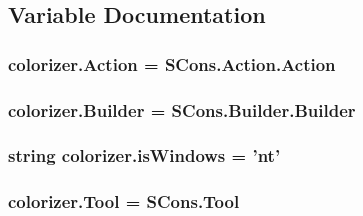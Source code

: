 \subsection{Variable Documentation}
\hypertarget{namespacecolorizer_ad54e0b191b008f45a3c9a0f46f001ec6}{
\subsubsection[{Action}]{\setlength{\rightskip}{0pt plus 5cm}colorizer.\-Action = S\-Cons.\-Action.\-Action}}\label{namespacecolorizer_ad54e0b191b008f45a3c9a0f46f001ec6}
\hypertarget{namespacecolorizer_aa50935d1e0570b90d5b17d9215c281ab}{
\subsubsection[{Builder}]{\setlength{\rightskip}{0pt plus 5cm}colorizer.\-Builder = S\-Cons.\-Builder.\-Builder}}\label{namespacecolorizer_aa50935d1e0570b90d5b17d9215c281ab}
\hypertarget{namespacecolorizer_a523a6a6c1c2773c7fa8b53f5bfa5eb76}{
\subsubsection[{is\-Windows}]{\setlength{\rightskip}{0pt plus 5cm}string colorizer.\-is\-Windows = 'nt'}}\label{namespacecolorizer_a523a6a6c1c2773c7fa8b53f5bfa5eb76}
\hypertarget{namespacecolorizer_ac55e06c89d73d0e0b274c1146e656777}{
\subsubsection[{Tool}]{\setlength{\rightskip}{0pt plus 5cm}colorizer.\-Tool = S\-Cons.\-Tool}}\label{namespacecolorizer_ac55e06c89d73d0e0b274c1146e656777}
